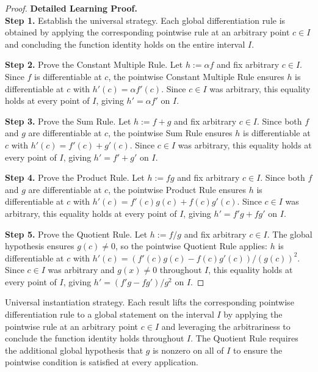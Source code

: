 \begin{proof}
\textbf{Detailed Learning Proof.}~\\

\textbf{Step 1.} Establish the universal strategy. Each global differentiation rule is obtained by applying the corresponding pointwise rule at an arbitrary point $c \in I$ and concluding the function identity holds on the entire interval $I$.

\textbf{Step 2.} Prove the Constant Multiple Rule. Let $h := \alpha f$ and fix arbitrary $c \in I$. Since $f$ is differentiable at $c$, the pointwise Constant Multiple Rule ensures $h$ is differentiable at $c$ with $h'(c) = \alpha f'(c)$. Since $c \in I$ was arbitrary, this equality holds at every point of $I$, giving $h' = \alpha f'$ on $I$.

\textbf{Step 3.} Prove the Sum Rule. Let $h := f + g$ and fix arbitrary $c \in I$. Since both $f$ and $g$ are differentiable at $c$, the pointwise Sum Rule ensures $h$ is differentiable at $c$ with $h'(c) = f'(c) + g'(c)$. Since $c \in I$ was arbitrary, this equality holds at every point of $I$, giving $h' = f' + g'$ on $I$.

\textbf{Step 4.} Prove the Product Rule. Let $h := fg$ and fix arbitrary $c \in I$. Since both $f$ and $g$ are differentiable at $c$, the pointwise Product Rule ensures $h$ is differentiable at $c$ with $h'(c) = f'(c)g(c) + f(c)g'(c)$. Since $c \in I$ was arbitrary, this equality holds at every point of $I$, giving $h' = f'g + fg'$ on $I$.

\textbf{Step 5.} Prove the Quotient Rule. Let $h := f/g$ and fix arbitrary $c \in I$. The global hypothesis ensures $g(c) \neq 0$, so the pointwise Quotient Rule applies: $h$ is differentiable at $c$ with $h'(c) = (f'(c)g(c) - f(c)g'(c))/(g(c))^2$. Since $c \in I$ was arbitrary and $g(x) \neq 0$ throughout $I$, this equality holds at every point of $I$, giving $h' = (f'g - fg')/g^2$ on $I$.
\end{proof}

\begin{remark*}
Universal instantiation strategy. Each result lifts the corresponding pointwise differentiation rule to a global statement on the interval $I$ by applying the pointwise rule at an arbitrary point $c \in I$ and leveraging the arbitrariness to conclude the function identity holds throughout $I$. The Quotient Rule requires the additional global hypothesis that $g$ is nonzero on all of $I$ to ensure the pointwise condition is satisfied at every application.
\end{remark*}

